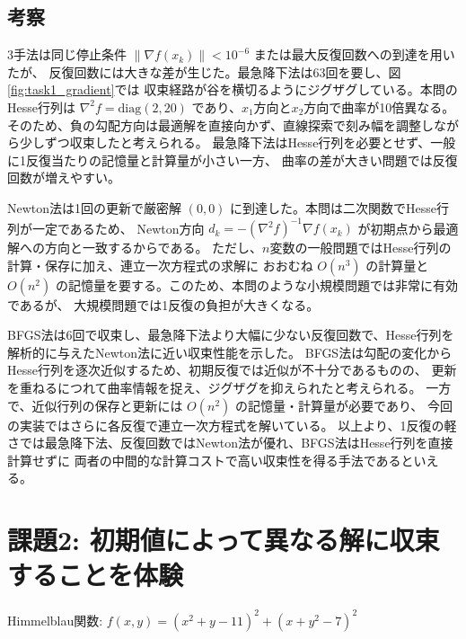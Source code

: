 \documentclass[11pt,a4paper]{ltjsarticle}
\begin{document}
\subsection{考察}
3手法は同じ停止条件 $\|\nabla f(x_k)\|<10^{-6}$ または最大反復回数への到達を用いたが、
反復回数には大きな差が生じた。最急降下法は63回を要し、図\ref{fig:task1_gradient}では
収束経路が谷を横切るようにジグザグしている。本問のHesse行列は
$\nabla^2 f=\mathrm{diag}(2,20)$ であり、$x_1$方向と$x_2$方向で曲率が10倍異なる。
そのため、負の勾配方向は最適解を直接向かず、直線探索で刻み幅を調整しながら少しずつ収束したと考えられる。
最急降下法はHesse行列を必要とせず、一般に1反復当たりの記憶量と計算量が小さい一方、
曲率の差が大きい問題では反復回数が増えやすい。

Newton法は1回の更新で厳密解 $(0,0)$ に到達した。本問は二次関数でHesse行列が一定であるため、
Newton方向 $d_k=-(\nabla^2 f)^{-1}\nabla f(x_k)$ が初期点から最適解への方向と一致するからである。
ただし、$n$変数の一般問題ではHesse行列の計算・保存に加え、連立一次方程式の求解に
おおむね $O(n^3)$ の計算量と $O(n^2)$ の記憶量を要する。このため、本問のような小規模問題では非常に有効であるが、
大規模問題では1反復の負担が大きくなる。

BFGS法は6回で収束し、最急降下法より大幅に少ない反復回数で、Hesse行列を解析的に与えたNewton法に近い収束性能を示した。
BFGS法は勾配の変化からHesse行列を逐次近似するため、初期反復では近似が不十分であるものの、
更新を重ねるにつれて曲率情報を捉え、ジグザグを抑えられたと考えられる。
一方で、近似行列の保存と更新には $O(n^2)$ の記憶量・計算量が必要であり、
今回の実装ではさらに各反復で連立一次方程式を解いている。
以上より、1反復の軽さでは最急降下法、反復回数ではNewton法が優れ、BFGS法はHesse行列を直接計算せずに
両者の中間的な計算コストで高い収束性を得る手法であるといえる。

\clearpage
\section{課題2: 初期値によって異なる解に収束することを体験}
Himmelblau関数: $f(x,y)=(x^{2}+y-11)^{2}+(x+y^{2}-7)^{2}$
\end{document}
